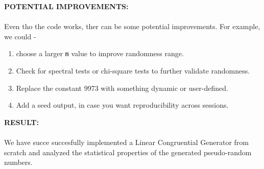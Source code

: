 \documentclass[12pt]{report}
\begin{document}
  \vspace{0.5cm}
  \noindent \textbf{POTENTIAL IMPROVEMENTS:} \\ \\ Even tho the code works, ther can be some potential improvements. For example, we could -
  \begin{enumerate}
    \item choose a larger \texttt{m} value to improve randomness range.
    \item Check for spectral tests or chi-square tests to further validate randomness.
    \item Replace the constant 9973 with something dynamic or user-defined.
    \item Add a seed output, in case you want reproducibility across sessions. \cite{chatgpt}
  \end{enumerate}
  \vspace{0.5cm}
  \noindent \textbf{RESULT:} \\ \\  We have succe succesfully implemented a Linear Congruential Generator from scratch and analyzed the statistical properties of the generated pseudo-random numbers.
\end{document}
